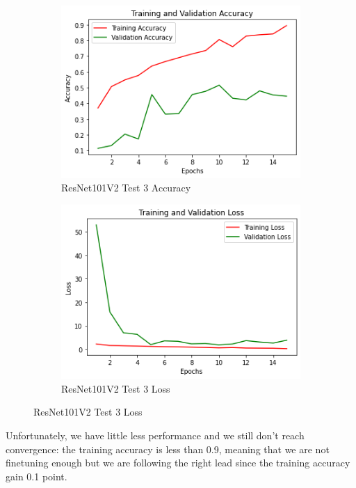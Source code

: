 \begin{figure}[H]
	\begin{subfigure}{0.5\textwidth}
		\includegraphics[width=0.9\linewidth]{img/resnet101v2/resnet101ft_block5_acc.png} 
		\caption{ResNet101V2 Test 3 Accuracy}
		\label{fig:resnet101ftblock5acc}
	\end{subfigure}
	\begin{subfigure}{0.5\textwidth}
		\includegraphics[width=0.9\linewidth]{img/resnet101v2/resnet101ft_block5_loss.png}
		\caption{ResNet101V2 Test 3 Loss}
		\label{fig:resnet101ftblock5loss}
	\end{subfigure}
\end{figure}

Unfortunately, we have little less performance and we still don't reach convergence: the training accuracy is less than 0.9, meaning that we are not finetuning enough but we are following the right lead since the training accuracy gain 0.1 point.


